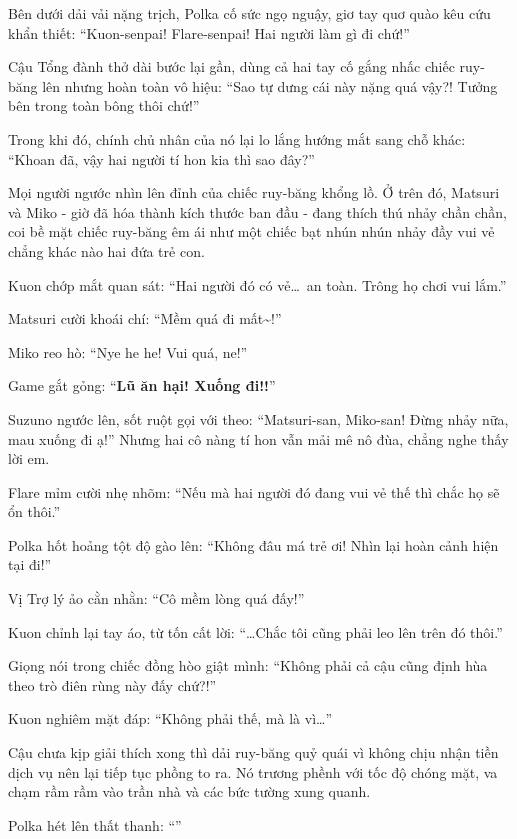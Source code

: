 \documentclass[../main.tex]{subfiles}
\begin{document}
Bên dưới dải vải nặng trịch, Polka cố sức ngọ nguậy, giơ tay quơ quào kêu cứu khẩn thiết: ``Kuon-senpai! Flare-senpai! Hai người làm gì đi chứ!''

Cậu Tổng đành thở dài bước lại gần, dùng cả hai tay cố gắng nhấc chiếc ruy-băng lên nhưng hoàn toàn vô hiệu: ``Sao tự dưng cái này nặng quá vậy?! Tưởng bên trong toàn bông thôi chứ!''

Trong khi đó, chính chủ nhân của nó lại lo lắng hướng mắt sang chỗ khác: ``Khoan đã, vậy hai người tí hon kia thì sao đây?''

Mọi người ngước nhìn lên đỉnh của chiếc ruy-băng khổng lồ. Ở trên đó, Matsuri và Miko - giờ đã hóa thành kích thước ban đầu - đang thích thú nhảy chần chần, coi bề mặt chiếc ruy-băng êm ái như một chiếc bạt nhún nhún nhảy đầy vui vẻ chẳng khác nào hai đứa trẻ con.


Kuon chớp mắt quan sát: ``Hai người đó có vẻ\dots\ an toàn. Trông họ chơi vui lắm.''

Matsuri cười khoái chí: ``Mềm quá đi mất\~{}!''

Miko reo hò: ``Nye he he! Vui quá, ne!''

Game gắt gỏng: ``\textbf{Lũ ăn hại! Xuống đi!!}''

Suzuno ngước lên, sốt ruột gọi với theo: ``Matsuri-san, Miko-san! Đừng nhảy nữa, mau xuống đi ạ!'' Nhưng hai cô nàng tí hon vẫn mải mê nô đùa, chẳng nghe thấy lời em.

Flare mỉm cười nhẹ nhõm: ``Nếu mà hai người đó đang vui vẻ thế thì chắc họ sẽ ổn thôi.''

Polka hốt hoảng tột độ gào lên: ``Không đâu má trẻ ơi! Nhìn lại hoàn cảnh hiện tại đi!''

Vị Trợ lý ảo cằn nhằn: ``Cô mềm lòng quá đấy!''

Kuon chỉnh lại tay áo, từ tốn cất lời: ``\dots Chắc tôi cũng phải leo lên trên đó thôi.''

Giọng nói trong chiếc đồng hòo giật mình: ``Không phải cả cậu cũng định hùa theo trò điên rùng này đấy chứ?!''

Kuon nghiêm mặt đáp: ``Không phải thế, mà là vì\dots''

Cậu chưa kịp giải thích xong thì dải ruy-băng quỷ quái vì không chịu nhận tiền dịch vụ nên lại tiếp tục phồng to ra. Nó trương phềnh với tốc độ chóng mặt, va chạm rầm rầm vào trần nhà và các bức tường xung quanh.

Polka hét lên thất thanh: ``''
\end{document}
